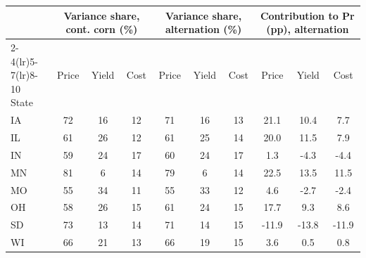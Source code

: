\begin{tabular}{lccccccccc}
\toprule
& \multicolumn{3}{c}{Variance share, cont. corn (\%)} & \multicolumn{3}{c}{Variance share, alternation (\%)} & \multicolumn{3}{c}{Contribution to Pr (pp), alternation}\\
\cmidrule(lr){2-4}\cmidrule(lr){5-7}\cmidrule(lr){8-10}
State & Price & Yield & Cost & Price & Yield & Cost & Price & Yield & Cost\\
\midrule
IA & 72 & 16 & 12 & 71 & 16 & 13 & 21.1 & 10.4 & 7.7 \\
IL & 61 & 26 & 12 & 61 & 25 & 14 & 20.0 & 11.5 & 7.9 \\
IN & 59 & 24 & 17 & 60 & 24 & 17 & 1.3 & -4.3 & -4.4 \\
MN & 81 & 6 & 14 & 79 & 6 & 14 & 22.5 & 13.5 & 11.5 \\
MO & 55 & 34 & 11 & 55 & 33 & 12 & 4.6 & -2.7 & -2.4 \\
OH & 58 & 26 & 15 & 61 & 24 & 15 & 17.7 & 9.3 & 8.6 \\
SD & 73 & 13 & 14 & 71 & 14 & 15 & -11.9 & -13.8 & -11.9 \\
WI & 66 & 21 & 13 & 66 & 19 & 15 & 3.6 & 0.5 & 0.8 \\
\bottomrule
\end{tabular}

